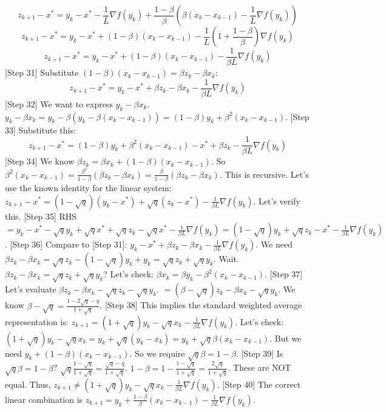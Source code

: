 \documentclass{article}
\begin{document}
$$ z_{k+1} - x^* = y_k - x^* - \frac{1}{L}\nabla f(y_k) + \frac{1-\beta}{\beta}\left(\beta(x_k - x_{k-1}) - \frac{1}{L}\nabla f(y_k)\right) $$
$$ z_{k+1} - x^* = y_k - x^* + (1-\beta)(x_k - x_{k-1}) - \frac{1}{L}\left(1 + \frac{1-\beta}{\beta}\right)\nabla f(y_k) $$
$$ z_{k+1} - x^* = y_k - x^* + (1-\beta)(x_k - x_{k-1}) - \frac{1}{\beta L}\nabla f(y_k) $$
[Step 31] Substitute $(1-\beta)(x_k - x_{k-1}) = \beta z_k - \beta x_k$:
$$ z_{k+1} - x^* = y_k - x^* + \beta z_k - \beta x_k - \frac{1}{\beta L}\nabla f(y_k) $$
[Step 32] We want to express $y_k - \beta x_k$.
$y_k - \beta x_k = y_k - \beta(y_k - \beta(x_k - x_{k-1})) = (1-\beta)y_k + \beta^2(x_k - x_{k-1})$.
[Step 33] Substitute this:
$$ z_{k+1} - x^* = (1-\beta)y_k + \beta^2(x_k - x_{k-1}) - x^* + \beta z_k - \frac{1}{\beta L}\nabla f(y_k) $$
[Step 34] We know $\beta z_k = \beta x_k + (1-\beta)(x_k - x_{k-1})$.
So $\beta^2(x_k - x_{k-1}) = \frac{\beta^2}{1-\beta}(\beta z_k - \beta x_k) = \frac{\beta}{1-\beta}(\beta z_k - \beta x_k)$. This is recursive.
Let's use the known identity for the linear system:
$z_{k+1} - x^* = (1-\sqrt{q})(y_k - x^*) + \sqrt{q}(z_k - x^*) - \frac{1}{\beta L}\nabla f(y_k)$. Let's verify this.
[Step 35] RHS $= y_k - x^* - \sqrt{q}y_k + \sqrt{q}x^* + \sqrt{q}z_k - \sqrt{q}x^* - \frac{1}{\beta L}\nabla f(y_k) = (1-\sqrt{q})y_k + \sqrt{q}z_k - x^* - \frac{1}{\beta L}\nabla f(y_k)$.
[Step 36] Compare to [Step 31]: $y_k - x^* + \beta z_k - \beta x_k - \frac{1}{\beta L}\nabla f(y_k)$.
We need $\beta z_k - \beta x_k = \sqrt{q}z_k - (1-\sqrt{q})y_k + y_k = \sqrt{q}z_k + \sqrt{q}y_k$.
Wait. $\beta z_k - \beta x_k = \sqrt{q}z_k + \sqrt{q}y_k$?
Let's check: $\beta x_k = \beta y_k - \beta^2(x_k - x_{k-1})$.
[Step 37] Let's evaluate $\beta z_k - \beta x_k - \sqrt{q}z_k - \sqrt{q}y_k$.
$= (\beta - \sqrt{q})z_k - \beta x_k - \sqrt{q}y_k$.
We know $\beta - \sqrt{q} = \frac{1-2\sqrt{q}-q}{1+\sqrt{q}}$.
[Step 38] This implies the standard weighted average representation is:
$z_{k+1} = (1+\sqrt{q})y_k - \sqrt{q}x_k - \frac{1}{\beta L}\nabla f(y_k)$.
Let's check: $(1+\sqrt{q})y_k - \sqrt{q}x_k = y_k + \sqrt{q}(y_k - x_k) = y_k + \sqrt{q}\beta(x_k - x_{k-1})$.
But we need $y_k + (1-\beta)(x_k - x_{k-1})$.
So we require $\sqrt{q}\beta = 1-\beta$.
[Step 39] Is $\sqrt{q}\beta = 1-\beta$?
$\sqrt{q} \frac{1-\sqrt{q}}{1+\sqrt{q}} = \frac{\sqrt{q} - q}{1+\sqrt{q}}$.
$1 - \beta = 1 - \frac{1-\sqrt{q}}{1+\sqrt{q}} = \frac{2\sqrt{q}}{1+\sqrt{q}}$.
These are NOT equal. Thus, $z_{k+1} \neq (1+\sqrt{q})y_k - \sqrt{q}x_k - \frac{1}{\beta L}\nabla f(y_k)$.
[Step 40] The correct linear combination is $z_{k+1} = y_k + \frac{1-\beta}{\beta}(x_k - x_{k-1}) - \frac{1}{\beta L}\nabla f(y_k)$.
\end{document}
